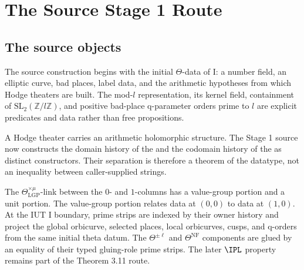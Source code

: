 \chapter{The Source Stage 1 Route}
\label{ch:stage1-source}

\section{The source objects}

\begin{definition}
  \label{def:initial-theta-data}
  \leanok
  The source construction begins with the initial \(\Theta\)-data of \IUT{} I:
  a number field, an elliptic curve, bad places, label data, and the
  arithmetic hypotheses from which Hodge theaters are built.  The mod-\(l\)
  representation, its kernel field, containment of
  \(\mathrm{SL}_2(\mathbb Z/l\mathbb Z)\), and positive bad-place
  q-parameter orders prime to \(l\) are explicit predicates and data rather
  than free propositions.
\end{definition}

\begin{definition}
  \label{def:hodge-theater-histories}
  \leanok
  A Hodge theater carries an arithmetic holomorphic structure.  The Stage 1
  source now constructs the domain history of the \qPilot{} and the
  codomain history of the \ThetaPilot{} as distinct constructors.  Their
  separation is therefore a theorem of the datatype, not an inequality between
  caller-supplied strings.
\end{definition}

\begin{definition}
  \label{def:prime-strip-links}
  \leanok
  The \(\Theta^{\times\mu}_{\mathrm{LGP}}\)-link between the \(0\)- and
  \(1\)-columns has a value-group portion and a unit portion.  The value-group
  portion relates \qPilot{} data at \((0,0)\) to \ThetaPilot{} data at
  \((1,0)\).  At the IUT I boundary, prime strips are indexed by their owner
  history and project the global orbicurve, selected places, local orbicurves,
  cusps, and q-orders from the same initial theta datum.  The
  \(\Theta^{\pm\ell}\) and \(\Theta^{\mathrm{NF}}\) components are glued by an
  equality of their typed gluing-role prime strips.  The later \(\IPL\)
  property remains part of the Theorem 3.11 route.
\end{definition}

